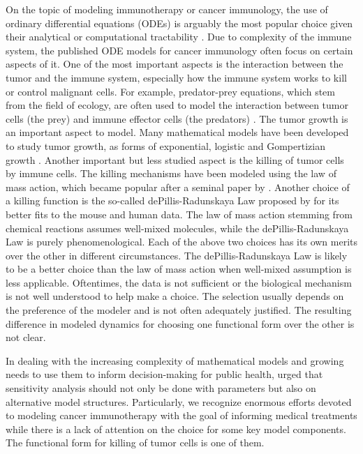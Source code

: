 \documentclass[review,authoryear]{elsarticle}
\begin{document}
On the topic of modeling immunotherapy or cancer immunology, the use of ordinary differential equations (ODEs) is arguably the most popular choice
given their analytical or computational tractability
\citep{Eftimie2010}. Due to complexity of the immune system, the published ODE models for cancer immunology often focus on certain aspects of it. One of the most important
aspects is the interaction between the tumor and the immune system, especially
how the immune system works to kill or control malignant cells. For example, predator-prey equations, which stem from the field of ecology, are often used to model the interaction between tumor cells (the prey) and immune effector cells (the predators) \citep{Hamilton2022}. The tumor growth is an important aspect to model. Many mathematical
models have been developed to study tumor growth, as forms of exponential, logistic and Gompertizian
growth \citep{Murphy2016}. Another important but less studied aspect is the killing of tumor cells
by immune cells. The killing mechanisms have been modeled using
the law of mass action, which became popular after a seminal paper by \citet{KUZNETSOV1994}.
Another choice of a killing function is the so-called dePillis-Radunskaya
Law proposed by \citet{Pillis2005} for its better fits to the mouse and human data. The law of mass action stemming from chemical reactions assumes well-mixed molecules, while the dePillis-Radunskaya
Law is purely phenomenological. Each of the above two choices has its own merits over the other in different circumstances. The dePillis-Radunskaya Law is likely to be a
better choice than the law of mass action when well-mixed
assumption is less applicable. Oftentimes, the data is not sufficient or the biological mechanism is not well understood to help make a choice. The selection usually depends on the preference
of the modeler and is not often adequately justified. The resulting difference in modeled dynamics for choosing one functional form over the other is not
clear. 

In dealing with the increasing complexity of mathematical models and growing
needs to use them to inform decision-making for public health, \citet{Basu2013} urged that sensitivity analysis should
not only be done with parameters but also on alternative model structures. Particularly, we recognize enormous efforts devoted
to modeling cancer immunotherapy with the goal of informing medical treatments
while there is a lack of attention on the choice for some key
model components. The functional form for killing of tumor cells is one of them.
\end{document}
